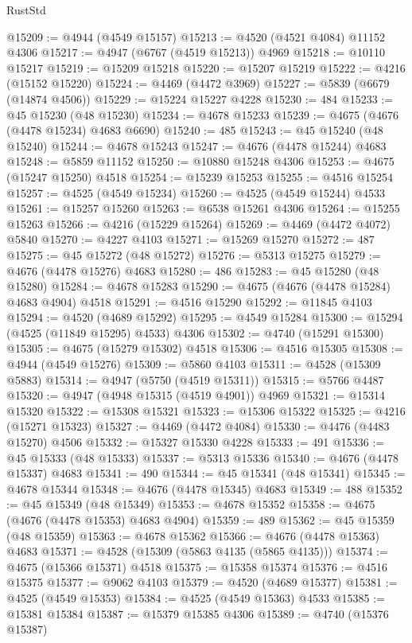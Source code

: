 \begin{lexlean}{RustStd}
\begin{coremodule}
@15209 := @4944 (@4549 @15157)
@15213 := @4520 (@4521 @4084) @11152 @4306
@15217 := @4947 (@6767 (@4519 @15213)) @4969
@15218 := @10110 @15217
@15219 := @15209 @15218
@15220 := @15207 @15219
@15222 := @4216 (@15152 @15220)
@15224 := @4469 (@4472 @3969)
@15227 := @5839 (@6679 (@14874 @4506))
@15229 := @15224 @15227 @4228
@15230 := 484
@15233 := @45 @15230 (@48 @15230)
@15234 := @4678 @15233
@15239 := @4675 (@4676 (@4478 @15234) @4683 @6690)
@15240 := 485
@15243 := @45 @15240 (@48 @15240)
@15244 := @4678 @15243
@15247 := @4676 (@4478 @15244) @4683
@15248 := @5859 @11152
@15250 := @10880 @15248 @4306
@15253 := @4675 (@15247 @15250) @4518
@15254 := @15239 @15253
@15255 := @4516 @15254
@15257 := @4525 (@4549 @15234)
@15260 := @4525 (@4549 @15244) @4533
@15261 := @15257 @15260
@15263 := @6538 @15261 @4306
@15264 := @15255 @15263
@15266 := @4216 (@15229 @15264)
@15269 := @4469 (@4472 @4072) @5840
@15270 := @4227 @4103
@15271 := @15269 @15270
@15272 := 487
@15275 := @45 @15272 (@48 @15272)
@15276 := @5313 @15275
@15279 := @4676 (@4478 @15276) @4683
@15280 := 486
@15283 := @45 @15280 (@48 @15280)
@15284 := @4678 @15283
@15290 := @4675 (@4676 (@4478 @15284) @4683 @4904) @4518
@15291 := @4516 @15290
@15292 := @11845 @4103
@15294 := @4520 (@4689 @15292)
@15295 := @4549 @15284
@15300 := @15294 (@4525 (@11849 @15295) @4533) @4306
@15302 := @4740 (@15291 @15300)
@15305 := @4675 (@15279 @15302) @4518
@15306 := @4516 @15305
@15308 := @4944 (@4549 @15276)
@15309 := @5860 @4103
@15311 := @4528 (@15309 @5883)
@15314 := @4947 (@5750 (@4519 @15311))
@15315 := @5766 @4487
@15320 := @4947 (@4948 @15315 (@4519 @4901)) @4969
@15321 := @15314 @15320
@15322 := @15308 @15321
@15323 := @15306 @15322
@15325 := @4216 (@15271 @15323)
@15327 := @4469 (@4472 @4084)
@15330 := @4476 (@4483 @15270) @4506
@15332 := @15327 @15330 @4228
@15333 := 491
@15336 := @45 @15333 (@48 @15333)
@15337 := @5313 @15336
@15340 := @4676 (@4478 @15337) @4683
@15341 := 490
@15344 := @45 @15341 (@48 @15341)
@15345 := @4678 @15344
@15348 := @4676 (@4478 @15345) @4683
@15349 := 488
@15352 := @45 @15349 (@48 @15349)
@15353 := @4678 @15352
@15358 := @4675 (@4676 (@4478 @15353) @4683 @4904)
@15359 := 489
@15362 := @45 @15359 (@48 @15359)
@15363 := @4678 @15362
@15366 := @4676 (@4478 @15363) @4683
@15371 := @4528 (@15309 (@5863 @4135 (@5865 @4135)))
@15374 := @4675 (@15366 @15371) @4518
@15375 := @15358 @15374
@15376 := @4516 @15375
@15377 := @9062 @4103
@15379 := @4520 (@4689 @15377)
@15381 := @4525 (@4549 @15353)
@15384 := @4525 (@4549 @15363) @4533
@15385 := @15381 @15384
@15387 := @15379 @15385 @4306
@15389 := @4740 (@15376 @15387)

\end{coremodule}
\end{lexlean}

